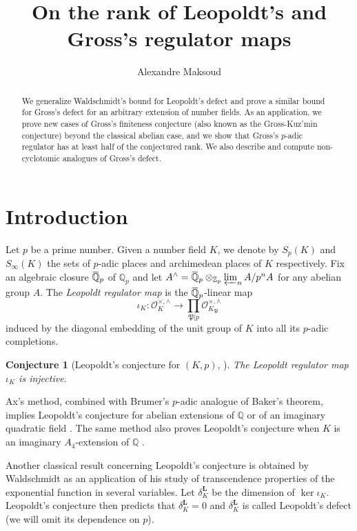 \documentclass[12pt]{amsart}
\author{Alexandre Maksoud}
\title{On the rank of Leopoldt's and Gross's regulator maps}
\newcommand{\Q}{\mathbb{Q}}
\newcommand\bQ{\mathbb{Q}}
\newcommand\Zp{{\mathbb{Z}_p}}
\newcommand\Qp{{\mathbb{Q}_p}}
\newcommand\cO{\mathcal{O}}
\newcommand\gP{\mathfrak{P}}
\newcommand{\ob}[1]{\mkern 1.5mu\overline{\mkern-1.5mu#1\mkern-1.5mu}\mkern 1.5mu}
\theoremstyle{defstyle}
\theoremstyle{thmstyle}
\newtheorem{CONJ}[subsection]{Conjecture}
\begin{document}
	\begin{abstract}
		We generalize Waldschmidt's bound for Leopoldt's defect and prove a similar bound for Gross's defect for an arbitrary extension of number fields. As an application, we prove new cases of Gross's finiteness conjecture (also known as the Gross-Kuz'min conjecture) beyond the classical abelian case, and we show that Gross's $p$-adic regulator has at least half of the conjectured rank. We also describe and compute non-cyclotomic analogues of Gross's defect.
	\end{abstract}
	\maketitle
	
	\section{Introduction}
	
	Let $p$ be a prime number. Given a number field $K$, we denote by $S_p(K)$ and $S_\infty(K)$ the sets of $p$-adic places and archimedean places of $K$ respectively. Fix an algebraic closure $\ob{\Q}_p$ of $\Qp$ and let $A^\wedge= \ob{\Q}_p \otimes_{\Zp} \varprojlim_n A/p^n A$ for any abelian group $A$. 
	The \emph{Leopoldt regulator map} is the $\ob{\Q}_p$-linear map
	\begin{equation}\label{eq:leopoldts_map}
		\iota_K \colon \cO_K^{\times,\wedge} \longrightarrow \prod_{\gP|p} \cO_{K_\gP}^{\times,\wedge}
	\end{equation}
	induced by the diagonal embedding of the unit group of $K$ into all its $p$-adic completions.
	
	\begin{CONJ}[Leopoldt's conjecture for $(K,p)$, \cite{leopoldt}]
		The Leopoldt regulator map $\iota_K$ is injective.
	\end{CONJ}
	
	
	Ax's method, combined with Brumer's $p$-adic analogue of Baker's theorem, implies Leopoldt's conjecture for abelian extensions of $\bQ$ or of an imaginary quadratic field \cite{ax,brumer}. The same method also proves Leopoldt's conjecture when $K$ is an imaginary $A_4$-extension of $\bQ$ \cite{emsalem1984independance}. 
	
	Another classical result concerning Leopoldt's conjecture is obtained by Waldschmidt as an application of his study of transcendence properties of the exponential function in several variables. Let $\delta^\textbf{L}_K$ be the dimension of $\ker \iota_K$. Leopoldt's conjecture then predicts that $\delta^\textbf{L}_K=0$ and $\delta^\textbf{L}_K$ is called Leopoldt's defect (we will omit its dependence on $p$). 
	 
\end{document}
